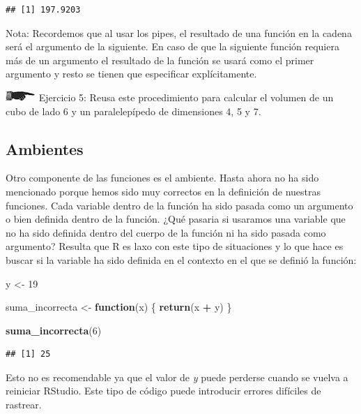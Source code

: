\documentclass[]{book}
\newenvironment{Shaded}{\begin{snugshade}}{\end{snugshade}}
\newcommand{\KeywordTok}[1]{\textcolor[rgb]{0.13,0.29,0.53}{\textbf{#1}}}
\newcommand{\DecValTok}[1]{\textcolor[rgb]{0.00,0.00,0.81}{#1}}
\newcommand{\StringTok}[1]{\textcolor[rgb]{0.31,0.60,0.02}{#1}}
\newcommand{\ControlFlowTok}[1]{\textcolor[rgb]{0.13,0.29,0.53}{\textbf{#1}}}
\newcommand{\OperatorTok}[1]{\textcolor[rgb]{0.81,0.36,0.00}{\textbf{#1}}}
\newcommand{\NormalTok}[1]{#1}
\theoremstyle{definition}
\theoremstyle{definition}
\theoremstyle{definition}
\theoremstyle{remark}
\begin{document}
\begin{verbatim}
## [1] 197.9203
\end{verbatim}

Nota: Recordemos que al usar los pipes, el resultado de una función en
la cadena será el argumento de la siguiente. En caso de que la siguiente
función requiera más de un argumento el resultado de la función se usará
como el primer argumento y resto se tienen que especificar
explícitamente.

\includegraphics{./imagenes/manicule2.jpg} Ejercicio 5: Reusa este
procedimiento para calcular el volumen de un cubo de lado 6 y un
paralelepípedo de dimensiones 4, 5 y 7.

\subsection{Ambientes}\label{ambientes}

Otro componente de las funciones es el ambiente. Hasta ahora no ha sido
mencionado porque hemos sido muy correctos en la definición de nuestras
funciones. Cada variable dentro de la función ha sido pasada como un
argumento o bien definida dentro de la función. ¿Qué pasaria si usaramos
una variable que no ha sido definida dentro del cuerpo de la función ni
ha sido pasada como argumento? Resulta que R es laxo con este tipo de
situaciones y lo que hace es buscar si la variable ha sido definida en
el contexto en el que se definió la función:

\begin{Shaded}
\begin{Highlighting}[]
\NormalTok{y <-}\StringTok{ }\DecValTok{19}

\NormalTok{suma_incorrecta <-}\StringTok{ }\ControlFlowTok{function}\NormalTok{(x) \{}
  \KeywordTok{return}\NormalTok{(x }\OperatorTok{+}\StringTok{ }\NormalTok{y)}
\NormalTok{\}}

\KeywordTok{suma_incorrecta}\NormalTok{(}\DecValTok{6}\NormalTok{)}
\end{Highlighting}
\end{Shaded}

\begin{verbatim}
## [1] 25
\end{verbatim}

Esto no es recomendable ya que el valor de \emph{y} puede perderse
cuando se vuelva a reiniciar RStudio. Este tipo de código puede
introducir errores difíciles de rastrear.
\end{document}
